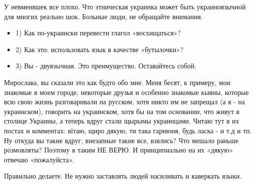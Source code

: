 \begin{itemize}
У невменяшек все плохо. Что этническая украинка может быть украиноязычной для
многих реально шок. Больные люди, не обращайте внимания.


 

\begin{itemize}
  \item 1) Как по-украински перевести глагол «восхищаться»?
  \item 2) Как это: использовать язык в качестве «бутылочки»?
  \item 3) Вы - двуязычная. Это преимущество. Оставайтесь собой.
\end{itemize}

 

Мирослава, вы сказали это как будто обо мне. Меня бесят, к примеру, мои
знакомые в моем городе, некоторые друзья и особенно знакомые кыяны, которые всю
свою жизнь разговаривали на русском, хотя никто им не запрещал (а я - на
украинском), говорить на украинском, хотя бы на том основании, что живут в
столице Украины, а теперь вдруг стали щырымы украинцами. Читаю тут в их постах
и комментах: вітаю, щиро дякую, ти така гарнюня, будь ласка - и т.д и тп. Ну
откуда вы такие вдруг, внезапные такие все, взялись? Что мешало раньше
розмовляты? Поэтому я таким НЕ ВЕРЮ. И принципиально на их «дякую» отвечаю
«пожалуйста».


 
Правильно делаете. Не нужно заставлять людей насиливать и каверкать языки.

 


\end{itemize}

